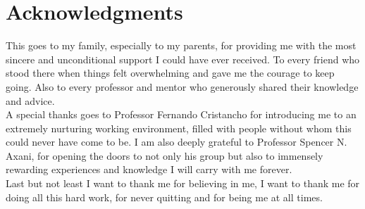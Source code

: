 \chapter*{Acknowledgments}
%

This goes to my family, especially to my parents, for providing me with the most sincere and unconditional support I could have ever received. To every friend who stood there when things felt overwhelming and gave me the courage to keep going. Also to every professor and mentor who generously shared their knowledge and advice.
\\

A special thanks goes to Professor Fernando Cristancho for introducing me to an extremely nurturing working environment, filled with people without whom this could never have come to be. I am also deeply grateful to Professor Spencer N. Axani, for opening the doors to not only his group but also to immensely rewarding experiences and knowledge I will carry with me forever.
\\

Last but not least I want to thank me for believing in me, I want to thank me for doing all this hard work, for never quitting and for being me at all times.